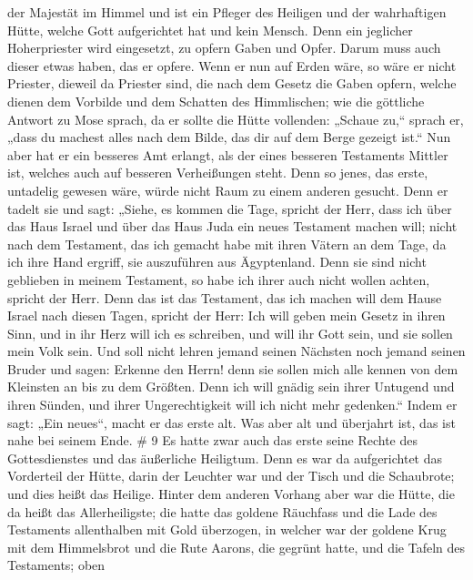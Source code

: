 der Majestät im Himmel  und ist ein Pfleger des Heiligen und
der wahrhaftigen Hütte, welche Gott aufgerichtet hat und kein Mensch.
 Denn ein jeglicher Hoherpriester wird eingesetzt, zu opfern
Gaben und Opfer. Darum muss auch dieser etwas haben, das er opfere.
 Wenn er nun auf Erden wäre, so wäre er nicht Priester,
dieweil da Priester sind, die nach dem Gesetz die Gaben opfern,
 welche dienen dem Vorbilde und dem Schatten des
Himmlischen; wie die göttliche Antwort zu Mose sprach, da er sollte die
Hütte vollenden: „Schaue zu,`` sprach er, „dass du machest alles nach
dem Bilde, das dir auf dem Berge gezeigt ist.``  Nun aber
hat er ein besseres Amt erlangt, als der eines besseren Testaments
Mittler ist, welches auch auf besseren Verheißungen steht. 
Denn so jenes, das erste, untadelig gewesen wäre, würde nicht Raum zu
einem anderen gesucht.  Denn er tadelt sie und sagt: „Siehe,
es kommen die Tage, spricht der Herr, dass ich über das Haus Israel und
über das Haus Juda ein neues Testament machen will;  nicht
nach dem Testament, das ich gemacht habe mit ihren Vätern an dem Tage,
da ich ihre Hand ergriff, sie auszuführen aus Ägyptenland. Denn sie sind
nicht geblieben in meinem Testament, so habe ich ihrer auch nicht wollen
achten, spricht der Herr.  Denn das ist das Testament, das
ich machen will dem Hause Israel nach diesen Tagen, spricht der Herr:
Ich will geben mein Gesetz in ihren Sinn, und in ihr Herz will ich es
schreiben, und will ihr Gott sein, und sie sollen mein Volk sein.
 Und soll nicht lehren jemand seinen Nächsten noch jemand
seinen Bruder und sagen: Erkenne den Herrn! denn sie sollen mich alle
kennen von dem Kleinsten an bis zu dem Größten.  Denn ich
will gnädig sein ihrer Untugend und ihren Sünden, und ihrer
Ungerechtigkeit will ich nicht mehr gedenken.``  Indem er
sagt: „Ein neues``, macht er das erste alt. Was aber alt und überjahrt
ist, das ist nahe bei seinem Ende. \# 9  Es hatte zwar auch
das erste seine Rechte des Gottesdienstes und das äußerliche Heiligtum.
 Denn es war da aufgerichtet das Vorderteil der Hütte, darin
der Leuchter war und der Tisch und die Schaubrote; und dies heißt das
Heilige.  Hinter dem anderen Vorhang aber war die Hütte, die
da heißt das Allerheiligste;  die hatte das goldene
Räuchfass und die Lade des Testaments allenthalben mit Gold überzogen,
in welcher war der goldene Krug mit dem Himmelsbrot und die Rute Aarons,
die gegrünt hatte, und die Tafeln des Testaments;  oben

